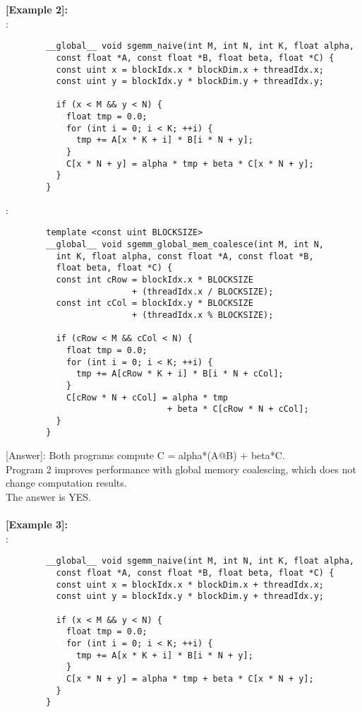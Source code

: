 \noindent\textbf{[Example 2]:}\\
      \text{    [Program 1]}:\\
      \begin{lstlisting}
        __global__ void sgemm_naive(int M, int N, int K, float alpha,
          const float *A, const float *B, float beta, float *C) {
          const uint x = blockIdx.x * blockDim.x + threadIdx.x;
          const uint y = blockIdx.y * blockDim.y + threadIdx.y;

          if (x < M && y < N) {
            float tmp = 0.0;
            for (int i = 0; i < K; ++i) {
              tmp += A[x * K + i] * B[i * N + y];
            }
            C[x * N + y] = alpha * tmp + beta * C[x * N + y];
          }
        }
      \end{lstlisting}
      \text{    [Program 2]}:\\
      \begin{lstlisting}
        template <const uint BLOCKSIZE>
        __global__ void sgemm_global_mem_coalesce(int M, int N,
          int K, float alpha, const float *A, const float *B,
          float beta, float *C) {
          const int cRow = blockIdx.x * BLOCKSIZE
                         + (threadIdx.x / BLOCKSIZE);
          const int cCol = blockIdx.y * BLOCKSIZE
                         + (threadIdx.x % BLOCKSIZE);

          if (cRow < M && cCol < N) {
            float tmp = 0.0;
            for (int i = 0; i < K; ++i) {
              tmp += A[cRow * K + i] * B[i * N + cCol];
            }
            C[cRow * N + cCol] = alpha * tmp
                                + beta * C[cRow * N + cCol];
          }
        }
      \end{lstlisting}
      [Answer]: Both programs compute C = alpha*(A@B) + beta*C.\\
                Program 2 improves performance with global memory coalescing, which does not change computation results.\\
                The answer is YES.\\
\\
\noindent\textbf{[Example 3]:}\\
      \text{    [Program 1]}:\\
      \begin{lstlisting}
        __global__ void sgemm_naive(int M, int N, int K, float alpha,
          const float *A, const float *B, float beta, float *C) {
          const uint x = blockIdx.x * blockDim.x + threadIdx.x;
          const uint y = blockIdx.y * blockDim.y + threadIdx.y;

          if (x < M && y < N) {
            float tmp = 0.0;
            for (int i = 0; i < K; ++i) {
              tmp += A[x * K + i] * B[i * N + y];
            }
            C[x * N + y] = alpha * tmp + beta * C[x * N + y];
          }
        }
      \end{lstlisting}
